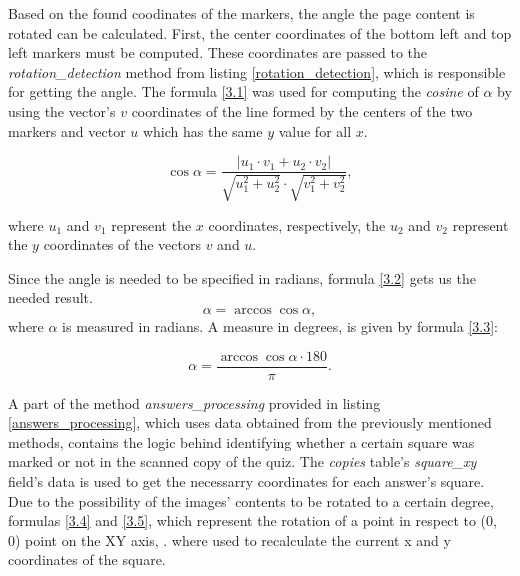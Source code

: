 

Based on the found coodinates of the markers, the angle the page content is rotated can be calculated. First, the center coordinates of the bottom left and top left markers must be computed. These coordinates are passed to the \textit{rotation\_detection} method from listing \ref{rotation_detection}, which is responsible for getting the angle. The formula \ref{3.1} \cite{cosalpha} was used for computing the \textit{cosine} of $\alpha$ by using the vector's $v$ coordinates of the line formed by the centers of the two markers and vector $u$ which has the same $y$ value for all $x$.

\begin{equation}
\cos \alpha = \frac{\left\vert u_{1} \cdot v_{1} + u_{2} \cdot v_{2} \right\vert }{\sqrt{u_{1}^{2}+u_{2}^{2}} \cdot \sqrt{v_{1}^{2}+v_{2}^{2}}},  \label{3.1}
\end{equation}

where $u_{1}$ and $v_{1}$ represent the $x$ coordinates, respectively, the $u_{2}$ and $v_{2}$ represent the $y$ coordinates of the vectors $v$ and $u$.

Since the angle is needed to be specified in radians, formula \ref{3.2} gets us the needed result.
\begin{equation}
\alpha = \arccos{\cos \alpha}, \label{3.2}
\end{equation}
where $\alpha$ is measured in radians. A measure in degrees, is given by formula \ref{3.3}: 


\begin{equation}
\alpha = \frac{\arccos \cos \alpha \cdot 180}{\pi}. \label{3.3}
\end{equation}




A part of the method \textit{answers\_processing} provided in listing \ref{answers_processing}, which uses data obtained from the previously mentioned methods, contains the logic behind identifying whether a certain square was marked or not in the scanned copy of the quiz. The \textit{copies} table's \textit{square\_xy} field's data is used to get the necessarry coordinates for each answer's square. Due to the possibility of the images' contents to be rotated to a certain degree, formulas \ref{3.4} and \ref{3.5}, which represent the rotation of a point in respect to (0, 0) point on the XY axis, \cite{point_rotation}. where used to recalculate the current x and y coordinates of the square. 

